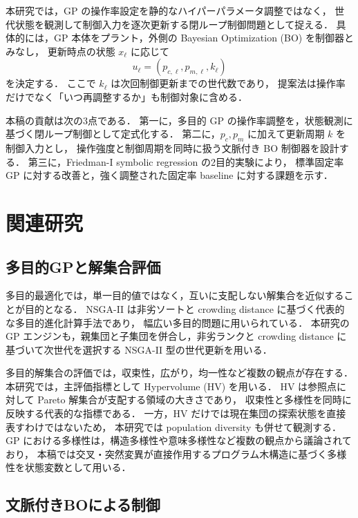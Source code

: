 \documentclass[a4paper,10pt,twocolumn]{ltjsarticle}
\begin{document}
本研究では，GP の操作率設定を静的なハイパーパラメータ調整ではなく，
世代状態を観測して制御入力を逐次更新する閉ループ制御問題として捉える．
具体的には，GP 本体をプラント，外側の Bayesian Optimization (BO) を制御器とみなし，
更新時点の状態 \(x_\ell\) に応じて
\[
  u_\ell=(p_{c,\ell},p_{m,\ell},k_\ell)
\]
を決定する．
ここで \(k_\ell\) は次回制御更新までの世代数であり，
提案法は操作率だけでなく「いつ再調整するか」も制御対象に含める．

本稿の貢献は次の3点である．
第一に，多目的 GP の操作率調整を，状態観測に基づく閉ループ制御として定式化する．
第二に，\(p_c,p_m\) に加えて更新周期 \(k\) を制御入力とし，
操作強度と制御周期を同時に扱う文脈付き BO 制御器を設計する．
第三に，Friedman-I symbolic regression の2目的実験により，
標準固定率 GP に対する改善と，強く調整された固定率 baseline に対する課題を示す．

\section{関連研究}

\subsection{多目的GPと解集合評価}

多目的最適化では，単一目的値ではなく，互いに支配しない解集合を近似することが目的となる．
NSGA-II は非劣ソートと crowding distance に基づく代表的な多目的進化計算手法であり，
幅広い多目的問題に用いられている\cite{verma2021}．
本研究の GP エンジンも，親集団と子集団を併合し，非劣ランクと crowding distance に基づいて次世代を選択する NSGA-II 型の世代更新を用いる．

多目的解集合の評価では，収束性，広がり，均一性など複数の観点が存在する\cite{li2019}．
本研究では，主評価指標として Hypervolume (HV) を用いる．
HV は参照点に対して Pareto 解集合が支配する領域の大きさであり，
収束性と多様性を同時に反映する代表的な指標である\cite{guerreiro2021}．
一方，HV だけでは現在集団の探索状態を直接表すわけではないため，
本研究では population diversity も併せて観測する．
GP における多様性は，構造多様性や意味多様性など複数の観点から議論されており\cite{burlacu2024}，
本稿では交叉・突然変異が直接作用するプログラム木構造に基づく多様性を状態変数として用いる．

\subsection{文脈付きBOによる制御}
\end{document}
